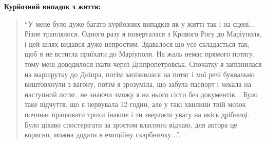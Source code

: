 \textbf{Курйозний випадок з життя:} 

\begin{quote}
\enquote{У мене було дуже багато курйозних випадків як у
житті так і на сцені... Різне траплялося. Одного разу я поверталася з Кривого
Рогу до Маріуполя, і цей шлях видався дуже непростим. Здавалося що усе
складається так, щоб я не встигла приїхати до Маріуполя. На жаль немає прямого
потягу, тому мені доводилося їхати через Дніпропетровськ. Спочатку я
запізнилася на маршрутку до Дніпра, потім запізнилася на потяг і мої речі
буквально виштовхнули з вагону, потім я зрозуміла, що забула паспорт і чекала
на наступний потяг, не знаючи зможу я на нього сісти без документів... Було таке
відчуття, що я нервувала 12 годин, але у такі хвилини твій мозок починає
працювати трохи інакше і ти звертаєш увагу на якісь дрібниці. Було цікаво
спостерігати за зростом власного відчаю, для актора це корисно, можна додати в
емоційну скарбничку...}.
\end{quote}

\endgroup
